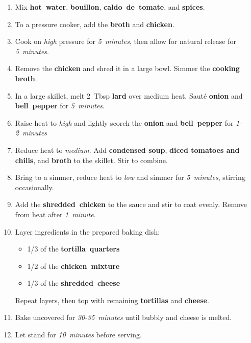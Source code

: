 \documentclass[11pt,letterpaper]{article}
\begin{document}
\begin{enumerate}
	\item Mix \textbf{hot~water}, \textbf{bouillon}, \textbf{caldo~de~tomate}, and \textbf{spices}.
    \item To a pressure cooker, add the \textbf{broth} and \textbf{chicken}.
	\item Cook on \textit{high} pressure for \textit{5~minutes}, then allow for natural release for \textit{5~minutes}.
	\item Remove the \textbf{chicken} and shred it in a large bowl. Simmer the \textbf{cooking broth}.
	\item In a large skillet, melt 2~Tbsp \textbf{lard} over medium heat. Sauté \textbf{onion} and \textbf{bell~pepper} for \textit{5~minutes}.
	\item Raise heat to \textit{high} and lightly scorch the \textbf{onion} and \textbf{bell~pepper} for \textit{1-2~minutes}
    \item Reduce heat to \textit{medium}. Add \textbf{condensed soup}, \textbf{diced tomatoes and chilis}, and \textbf{broth} to the skillet. Stir to combine.
    \item Bring to a simmer, reduce heat to \textit{low} and simmer for \textit{5~minutes}, stirring occasionally.
    \item Add the \textbf{shredded~chicken} to the sauce and stir to coat evenly. Remove from heat after \textit{1~minute}.
    \item Layer ingredients in the prepared baking dish:
    \begin{itemize}
        \item 1/3 of the \textbf{tortilla~quarters}
        \item 1/2 of the \textbf{chicken~mixture}
        \item 1/3 of the \textbf{shredded~cheese}
    \end{itemize}
    
    Repeat layers, then top with remaining \textbf{tortillas} and \textbf{cheese}.
    
    \item Bake uncovered for \textit{30-35~minutes} until bubbly and cheese is melted.

    \item Let stand for \textit{10~minutes} before serving.
\end{enumerate}
\end{document}
